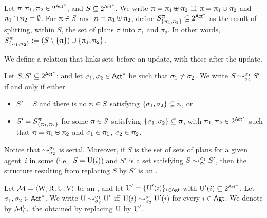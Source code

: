 
\medskip

\begin{definition}
Let $\plans, \plans_1, \plans_2 \in 2^{\ACT^*}$, and $S \subseteq 2^{\ACT^*}$.  We write $\plans = \plans_1\uplus\plans_2$ iff $\plans=\plans_1\cup\plans_2$ and $\plans_1\cap\plans_2=\emptyset$.
For $\plans \in S$ and $\plans=\plans_1\uplus\plans_2$, define  $\lmodel{S}{\plans}{\set{\plans_1,\plans_2}} \subseteq 2^{\ACT^*}$ as the result of splitting, within $S$, the set of plans $\pi$ into $\pi_1$ and $\pi_2$. In other words, $\lmodel{S}{\plans}{\set{\plans_1,\plans_2}} := (S\setminus\set{\plans})\cup\set{\plans_1,\plans_2}$.
\end{definition}

\medskip

We define a relation that links sets before an update, with those after the update.

\medskip

\begin{definition}\label{def:splitstr}
Let $S,S' \subseteq 2^{\ACT^*}$; and let $\plan_1,\plan_2 \in \ACT^*$ be such that $\plan_1\neq\plan_2$.
We write $\splitstr{S}{S'}{\plan_1}{\plan_2}$ if and only if either
\begin{itemize} \itemsep 0cm
\item $S' = S$ and there is no $\plans\in S$ satisfying $\set{\plan_1, \plan_2} \subseteq \plans$, or
\item $S' = \lmodel{S}{\plans}{\set{\plans_1,\plans_2}}$ for some $\plans \in S$ satisfying $\set{\plan_1, \plan_2} \subseteq \plans$, with $\plans_1, \plans_2 \in 2^{\ACT^*}$ such that
$\plans = \plans_1\uplus\plans_2$ and
$\plan_1 \in \plans_1$, $\plan_2 \in \plans_2$.
\end{itemize}
\end{definition}

\medskip

Notice that $\splitstr{}{}{\plan_1}{\plan_2}$ is serial. Moreover, if $S$ is the set of sets of plans for a given agent~$i$ in some \ults (i.e., $S=\Unc(i)$) and $S'$ is a set satisfying $\splitstr{S}{S'}{\plan_1}{\plan_2}$, then the structure resulting from replacing $S$ by $S'$ is an \ults.

\medskip

\begin{definition}
Let $\modults=\tup{\W,\R,\Unc,\V}$ be an \ults, and let $\Unc'=\set{\Unc'(i)}_{i\in\AGT}$ with ${\Unc'(i)\subseteq 2^{\ACT^*}}$.
Let $\plan_1,\plan_2 \in \ACT^*$. We write $\splitstr{\Unc}{\Unc'}{\plan_1}{\plan_2}$ iff $\splitstr{\Unc(i)}{\Unc'(i)}{\plan_1}{\plan_2}$ for every $i\in\AGT$.
We denote by $\modults^{\Unc}_{\Unc'}$ the \ults obtained by replacing $\Unc$ by $\Unc'$.
\end{definition}

